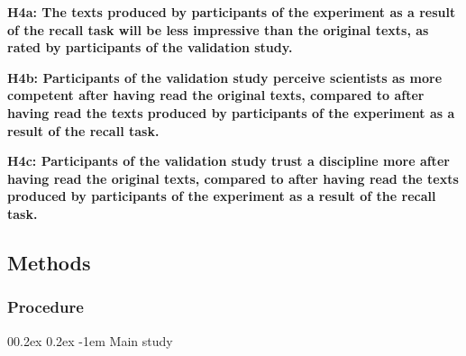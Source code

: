\documentclass[
  doc,floatsintext]{apa6}
\makeatletter
\let\oldparagraph\paragraph
\renewcommand{\paragraph}{
    \@ifstar
      \xxxParagraphStar
      \xxxParagraphNoStar
  }
\newcommand{\xxxParagraphStar}[1]{\oldparagraph*{#1}\mbox{}}
\newcommand{\xxxParagraphNoStar}[1]{\oldparagraph{#1}\mbox{}}
\renewcommand{\paragraph}{\@startsection{paragraph}{4}{\parindent}%
  {0\baselineskip \@plus 0.2ex \@minus 0.2ex}%
  {-1em}%
  {\normalfont\normalsize\bfseries\itshape\typesectitle}}
\makeatother
\begin{document}
\textbf{H4a: The texts produced by participants of the experiment as a result of the recall task will be less impressive than the original texts, as rated by participants of the validation study.}

\textbf{H4b: Participants of the validation study perceive scientists as more competent after having read the original texts, compared to after having read the texts produced by participants of the experiment as a result of the recall task.}

\textbf{H4c: Participants of the validation study trust a discipline more after having read the original texts, compared to after having read the texts produced by participants of the experiment as a result of the recall task.}

\subsection{Methods}\label{methods-1}

\subsubsection{Procedure}\label{procedure-1}

\paragraph{Main study}\label{main-study}
\end{document}
